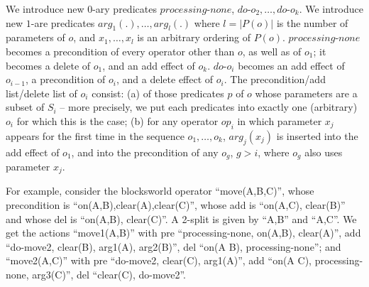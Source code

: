 We introduce new $0$-ary predicates $processing\mbox{-}none$,
$do\mbox{-}o_2, \dots, do\mbox{-}o_k$. We introduce new $1$-are
predicates $arg_1(.), \dots, arg_l(.)$ where $l = |P(o)|$ is the
number of parameters of $o$, and $x_1, \dots, x_l$ is an arbitrary
ordering of $P(o)$. $processing\mbox{-}none$ becomes a precondition of
every operator other than $o$, as well as of $o_1$; it becomes a
delete of $o_1$, and an add effect of $o_k$. $do\mbox{-}o_i$ becomes
an add effect of $o_{i-1}$, a precondition of $o_i$, and a delete
effect of $o_i$. The precondition/add list/delete list of $o_i$
consist: (a) of those predicates $p$ of $o$ whose parameters are a
subset of $S_i$ -- more precisely, we put each predicates into exactly
one (arbitrary) $o_i$ for which this is the case; (b) for any operator
$op_i$ in which parameter $x_j$ appears for the first time in the
sequence $o_1, \dots, o_k$, $arg_j(x_j)$ is inserted into the add
effect of $o_1$, and into the precondition of any $o_g$, $g > i$,
where $o_g$ also uses parameter $x_j$. 


For example, consider the blocksworld operator ``move(A,B,C)'', whose
precondition is ``on(A,B),clear(A),clear(C)'', whose add is ``on(A,C),
clear(B)'' and whose del is ``on(A,B), clear(C)''. A 2-split is given
by ``A,B'' and ``A,C''. We get the actions ``move1(A,B)'' with pre
``processing-none, on(A,B), clear(A)'', add ``do-move2, clear(B),
arg1(A), arg2(B)'', del ``on(A B), processing-none''; and
``move2(A,C)'' with pre ``do-move2, clear(C), arg1(A)'', add ``on(A C),
processing-none, arg3(C)'', del ``clear(C), do-move2''.






